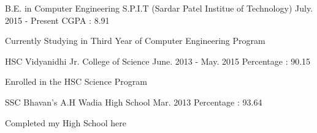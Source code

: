 

\begin{cventries}

  \cventry
    {B.E. in Computer Engineering} %
    {S.P.I.T (Sardar Patel Institue of Technology)} %
    {July. 2015 - Present} %
    {CGPA : 8.91} %
    {
      \begin{cvitems} %
        \item {Currently Studying in Third Year of Computer Engineering Program}
      \end{cvitems}
    }
  \cventry
    {HSC} %
    {Vidyanidhi Jr. College of Science} %
    {June. 2013 - May. 2015} %
    {Percentage : 90.15} %
    {
      \begin{cvitems} %
        \item {Enrolled in the HSC Science Program}
      \end{cvitems}
    }
  \cventry
    {SSC} %
    {Bhavan's A.H Wadia High School} %
    {Mar. 2013} %
    {Percentage : 93.64} %
    {
      \begin{cvitems} %
        \item {Completed my High School here}
      \end{cvitems}
    }

\end{cventries}
